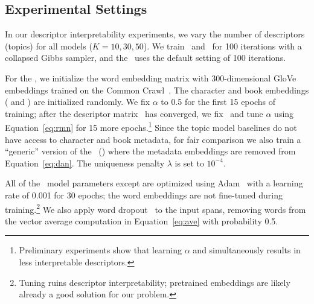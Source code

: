 \subsection{Experimental Settings}

In our descriptor interpretability experiments, we vary the number of
descriptors (topics) for all models ($K=10,30,50$). We train \lda\ and
\nubbi\ for 100 iterations with a collapsed Gibbs sampler, and the \htmm\ uses
the default setting of 100  iterations.










For the \rmn, we initialize the word embedding matrix  with
300-dimensional GloVe embeddings trained on the Common
Crawl~\cite{glove2014}. The character and book embeddings ( and
) are initialized randomly. We fix $\alpha$ to 0.5 for the first 15
epochs of training; after the descriptor matrix \ has converged, we fix
\ and tune $\alpha$ using Equation~\ref{eq:rmn} for 15 more
epochs.\footnote{Preliminary experiments show that learning $\alpha$ and
   simultaneously results in less interpretable descriptors.} Since the
topic model baselines do not have access to character and book metadata, for
fair comparison we also train a ``generic'' version of the \rmn\ (\grmn) where
the metadata embeddings are removed from Equation~\ref{eq:dan}. The uniqueness
penalty $\lambda$ is set to $10^{-4}$.








All of the \rmn\ model parameters except  are optimized using
Adam~\cite{kingma2014adam} with a learning rate of 0.001 for 30 epochs; the word
embeddings are not fine-tuned during training.\footnote{Tuning  ruins
  descriptor interpretability; pretrained embeddings are likely already a good
  solution for our problem.} We also apply word dropout~\cite{IyyerDAN} to the
input spans, removing words from the vector average computation in
Equation~\ref{eq:ave} with probability 0.5.

